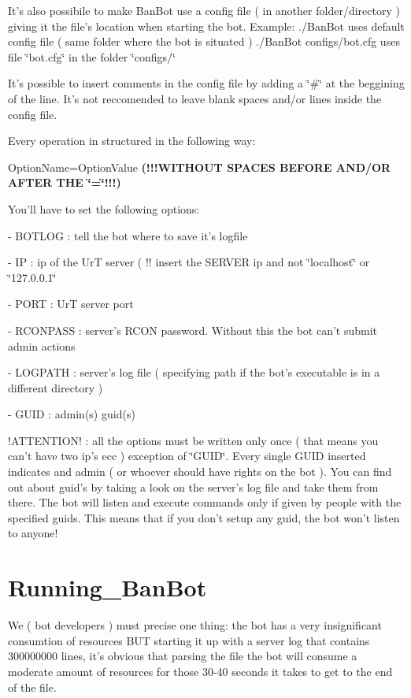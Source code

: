 It's also possibile to make BanBot use a config file ( in another folder/directory ) giving it the file's location when starting the bot. Example: ./BanBot uses default config file ( same folder where the bot is situated ) ./BanBot configs/bot.cfg uses file \char`\"{}bot.cfg\char`\"{} in the folder \char`\"{}configs/\char`\"{}

It's possible to insert comments in the config file by adding a \char`\"{}\#\char`\"{} at the beggining of the line. It's not reccomended to leave blank spaces and/or lines inside the config file.

Every operation in structured in the following way:

OptionName=OptionValue {\bfseries (!!!WITHOUT SPACES BEFORE AND/OR AFTER THE \char`\"{}=\char`\"{}!!!)}

You'll have to set the following options:

\begin{DoxyItemize}
\item -\/ BOTLOG : tell the bot where to save it's logfile \item -\/ IP : ip of the UrT server ( !! insert the SERVER ip and not \char`\"{}localhost\char`\"{} or \char`\"{}127.0.0.1\char`\"{} \item -\/ PORT : UrT server port \item -\/ RCONPASS : server's RCON password. Without this the bot can't submit admin actions \item -\/ LOGPATH : server's log file ( specifying path if the bot's executable is in a different directory ) \item -\/ GUID : admin(s) guid(s)\end{DoxyItemize}
!ATTENTION! : all the options must be written only once ( that means you can't have two ip's ecc ) exception of \char`\"{}GUID\char`\"{}. Every single GUID inserted indicates and admin ( or whoever should have rights on the bot ). You can find out about guid's by taking a look on the server's log file and take them from there. The bot will listen and execute commands only if given by people with the specified guids. This means that if you don't setup any guid, the bot won't listen to anyone!\hypertarget{main_Running_BanBot}{}\section{Running\_\-BanBot}\label{main_Running_BanBot}
We ( bot developers ) must precise one thing: the bot has a very insignificant consumtion of resources BUT starting it up with a server log that contains 300000000 lines, it's obvious that parsing the file the bot will consume a moderate amount of resources for those 30-\/40 seconds it takes to get to the end of the file.

